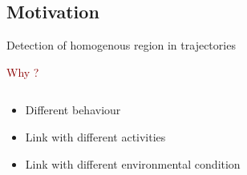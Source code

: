 \documentclass{beamer}\usepackage[]{graphicx}\usepackage[]{color}
\newcommand{\emphase}[1]{\textcolor{darkred}{#1}}
\newcommand{\paragraph}[1]{\emphase{#1}}
\begin{document}
\subsection{Motivation}
\begin{frame}[fragile]{Detection of homogenous region in trajectories}

  \paragraph{Why ?}
\begin{columns}
\begin{column}{0.4\textwidth}
\begin{itemize}
\item Different behaviour
\item Link with different activities
\item Link with different environmental condition
\end{itemize}

\end{column}
\begin{column}{0.6\textwidth}



  
\end{column}
\end{columns}
\end{frame}
\end{document}
